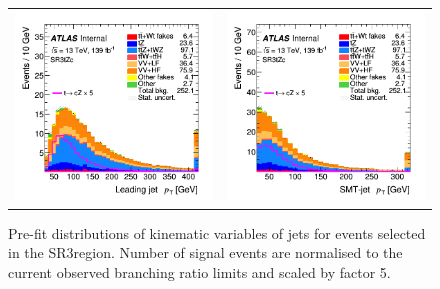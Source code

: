 \begin{figure}[htbp]
\begin{tabular}{cc}
		\includegraphics[width=.45\textwidth]{Chapters/CH5/figures/SR3_UsingSMT/jet_pt} &
		\includegraphics[width=.45\textwidth]{Chapters/CH5/figures/SR3_UsingSMT/SMTjet_Pt} \\
	\end{tabular}
	\caption{Pre-fit distributions of kinematic variables of jets for events selected in the SR3\tZc region. Number of signal events are normalised to the current observed branching ratio limits and scaled by factor 5. 
		\ErrStatOnly
		\Blinded
	}%
	\label{fig:sr3_kin_jet}
\end{figure}
\newpage
